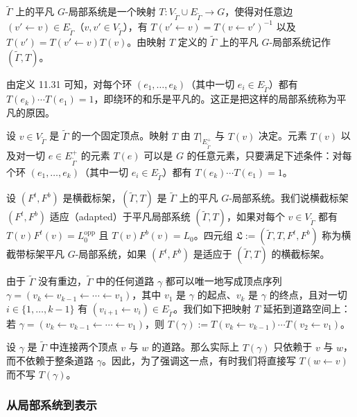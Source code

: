 \begin{definition}[11.31]
$\tilde\Gamma$ 上的平凡 $G$-局部系统是一个映射 $T\colon V_{\tilde\Gamma}\cup E_{\tilde\Gamma}\to G$，使得对任意边 $(v'\leftarrow v)\in E_{\tilde\Gamma}$（$v,v'\in V_{\tilde\Gamma}$），有 $T(v'\leftarrow v)=T(v\leftarrow v')^{-1}$ 以及 $T(v')=T(v'\leftarrow v)T(v)$。由映射 $T$ 定义的 $\tilde\Gamma$ 上的平凡 $G$-局部系统记作 $(\tilde\Gamma,T)$。
\end{definition}

\begin{remark}[11.32]
由定义 11.31 可知，对每个环 $(e_1,\dots,e_k)$（其中一切 $e_i\in E_{\tilde\Gamma}$）都有 $T(e_k)\cdots T(e_1)=1$，即绕环的和乐是平凡的。这正是把这样的局部系统称为平凡的原因。
\end{remark}

设 $v\in V_{\tilde\Gamma}$ 是 $\tilde\Gamma$ 的一个固定顶点。映射 $T$ 由 $T|_{E_{\tilde\Gamma}^{+}}$ 与 $T(v)$ 决定。元素 $T(v)$ 以及对一切 $e\in E_{\tilde\Gamma}^{+}$ 的元素 $T(e)$ 可以是 $G$ 的任意元素，只要满足下述条件：对每个环 $(e_1,\dots,e_k)$（其中一切 $e_i\in E_{\tilde\Gamma}$）都有 $T(e_k)\cdots T(e_1)=1$。

设 $(F^{t},F^{b})$ 是横截标架，$(\tilde\Gamma,T)$ 是 $\tilde\Gamma$ 上的平凡 $G$-局部系统。我们说横截标架 $(F^{t},F^{b})$ 适应（adapted）于平凡局部系统 $(\tilde\Gamma,T)$，如果对每个 $v\in V_{\tilde\Gamma}$ 都有 $T(v)F^{t}(v)=L_0^{\mathrm{opp}}$ 且 $T(v)F^{b}(v)=L_0$。四元组 $\mathfrak{L}:=(\tilde\Gamma,T,F^{t},F^{b})$ 称为横截带标架平凡 $G$-局部系统，如果 $(F^{t},F^{b})$ 是适应于 $(\tilde\Gamma,T)$ 的横截标架。


由于 $\tilde\Gamma$ 没有重边，$\tilde\Gamma$ 中的任何道路 $\gamma$ 都可以唯一地写成顶点序列 $\gamma=(v_k\leftarrow v_{k-1}\leftarrow\cdots\leftarrow v_1)$，其中 $v_1$ 是 $\gamma$ 的起点、$v_k$ 是 $\gamma$ 的终点，且对一切 $i\in\{1,\dots,k-1\}$ 有 $(v_{i+1}\leftarrow v_i)\in E_{\tilde\Gamma}$。我们如下把映射 $T$ 延拓到道路空间上：若 $\gamma=(v_k\leftarrow v_{k-1}\leftarrow\cdots\leftarrow v_1)$，则 $T(\gamma):=T(v_k\leftarrow v_{k-1})\cdots T(v_2\leftarrow v_1)$。

\begin{remark}[11.33]
设 $\gamma$ 是 $\tilde\Gamma$ 中连接两个顶点 $v$ 与 $w$ 的道路。那么实际上 $T(\gamma)$ 只依赖于 $v$ 与 $w$，而不依赖于整条道路 $\gamma$。因此，为了强调这一点，有时我们将直接写 $T(w\leftarrow v)$ 而不写 $T(\gamma)$。
\end{remark}

\subsubsection{从局部系统到表示}

